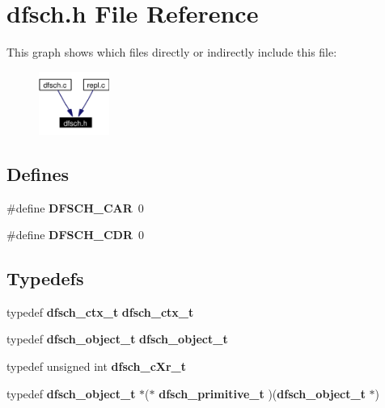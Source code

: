 \section{dfsch.h File Reference}
\label{dfsch_8h}


This graph shows which files directly or indirectly include this file:\begin{figure}[H]
\begin{center}
\leavevmode
\includegraphics[width=65pt]{dfsch_8h__dep__incl}
\end{center}
\end{figure}
\subsection*{Defines}
\begin{CompactItemize}
\item 
\#define {\bf DFSCH\_\-CAR}\ 0\label{dfsch_8h_a0}

\item 
\#define {\bf DFSCH\_\-CDR}\ 0\label{dfsch_8h_a1}

\end{CompactItemize}
\subsection*{Typedefs}
\begin{CompactItemize}
\item 
typedef {\bf dfsch\_\-ctx\_\-t} {\bf dfsch\_\-ctx\_\-t}
\item 
typedef {\bf dfsch\_\-object\_\-t} {\bf dfsch\_\-object\_\-t}
\item 
typedef unsigned int {\bf dfsch\_\-c\-Xr\_\-t}
\item 
typedef {\bf dfsch\_\-object\_\-t} $\ast$($\ast$ {\bf dfsch\_\-primitive\_\-t} )({\bf dfsch\_\-object\_\-t} $\ast$)
\end{CompactItemize}
